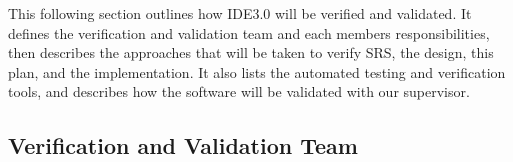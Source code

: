 \documentclass[12pt, titlepage]{article}
\begin{document}

This following section outlines how IDE3.0 will be verified and validated. It defines the verification and validation team and each members responsibilities, then describes the approaches that will be 
taken to verify SRS, the design, this plan, and the implementation. It also lists the automated testing and verification tools, and describes how the software will be validated with our supervisor. 


\subsection{Verification and Validation Team}

\end{document}
